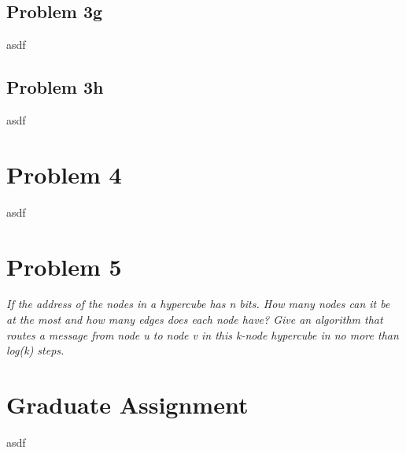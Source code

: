 \documentclass{article}
\begin{document}
\subsection{Problem 3g}
asdf

\subsection{Problem 3h}
asdf



\section{Problem 4}
asdf


\section{Problem 5}
\textit{If the address of the nodes in a hypercube has n bits. How many nodes can it be at the most and how many edges does each node have? 
Give an algorithm that routes a message from node u to node v in this k-node hypercube in no more than log(k) steps.}


\section{Graduate Assignment}
asdf
\end{document}
